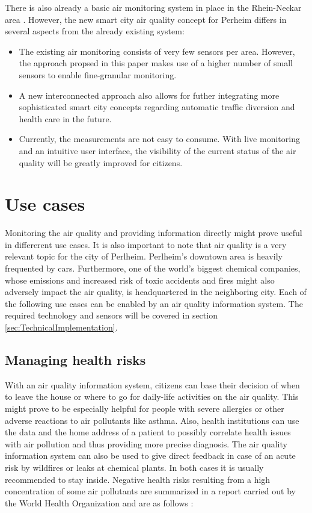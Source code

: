 \documentclass[conference]{IEEEtran}
\begin{document}
There is also already a basic air monitoring system in place in the Rhein-Neckar area \cite{LandesanstaltfurUmweltBadenWurttemberg}.
However, the new smart city air quality concept for Perheim differs in several aspects from the already existing system:
\begin{itemize} 
\item The existing air monitoring consists of very few sensors per area. However, the approach propsed in this paper makes use of a higher number of small sensors to enable fine-granular monitoring.
\item A new interconnected approach also allows for futher integrating more sophisticated smart city concepts regarding automatic traffic diversion and health care in the future.
\item Currently, the measurements are not easy to consume. With live monitoring and an intuitive user interface, the visibility of the current status of the air quality will be greatly improved for citizens.
\end{itemize} 

\section{Use cases}
Monitoring the air quality and providing information directly might prove useful in differerent use cases. It is also important to note that air quality is a very relevant topic for the city of Perlheim. Perlheim's downtown area is heavily frequented by cars. Furthermore, one of the world's biggest chemical companies, whose emissions and increased risk of toxic accidents and fires might also adversely impact the air quality, is headquartered in the neighboring city. 
\newline \newline
Each of the following use cases can be enabled by an air quality information system. The required technology and sensors will be covered in section \ref{sec:TechnicalImplementation}.

\subsection{Managing health risks}
With an air quality information system, citizens can base their decision of when to leave the house or where to go for daily-life activities on the air quality. This might prove to be especially helpful for people with severe allergies or other adverse reactions to air pollutants like asthma. Also, health institutions can use the data and the home address of a patient to possibly correlate health issues with air pollution and thus providing more precise diagnosis. The air quality information system can also be used to give direct feedback in case of an acute risk by wildfires or leaks at chemical plants. In both cases it is usually recommended to stay inside. Negative health risks resulting from a high concentration of some air pollutants are summarized in a report carried out by the World Health Organization and are as follows \cite{WorldHealthOrganization.2013}:
\end{document}
